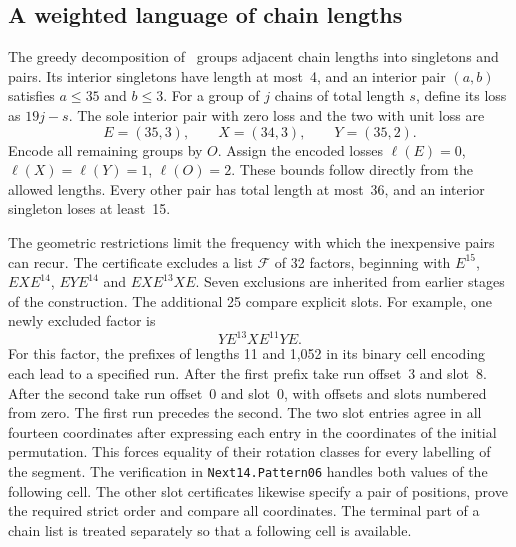 \documentclass[11pt]{article}
\begin{document}
\subsection{A weighted language of chain lengths}
The greedy decomposition of~\cite{pantone} groups adjacent chain lengths into singletons and pairs. Its interior singletons have length at most~4, and an interior pair $(a,b)$ satisfies $a\le35$ and $b\le3$. For a group of $j$ chains of total length $s$, define its loss as $19j-s$. The sole interior pair with zero loss and the two with unit loss are
\[
 E=(35,3),\qquad X=(34,3),\qquad Y=(35,2).
\]
Encode all remaining groups by $O$. Assign the encoded losses $\ell(E)=0$, $\ell(X)=\ell(Y)=1$, $\ell(O)=2$. These bounds follow directly from the allowed lengths. Every other pair has total length at most~36, and an interior singleton loses at least~15.

The geometric restrictions limit the frequency with which the inexpensive pairs can recur. The certificate excludes a list $\mathcal F$ of 32 factors, beginning with $E^{15}$, $EXE^{14}$, $EYE^{14}$ and $EXE^{13}XE$. Seven exclusions are inherited from earlier stages of the construction. The additional 25 compare explicit slots. For example, one newly excluded factor is
\[
                         Y E^{13} X E^{11} Y E .
\]
For this factor, the prefixes of lengths 11 and 1,052 in its binary cell encoding each lead to a specified run. After the first prefix take run offset~3 and slot~8. After the second take run offset~0 and slot~0, with offsets and slots numbered from zero. The first run precedes the second. The two slot entries agree in all fourteen coordinates after expressing each entry in the coordinates of the initial permutation. This forces equality of their rotation classes for every labelling of the segment. The verification in \texttt{Next14.Pattern06} handles both values of the following cell. The other slot certificates likewise specify a pair of positions, prove the required strict order and compare all coordinates. The terminal part of a chain list is treated separately so that a following cell is available.
\end{document}
